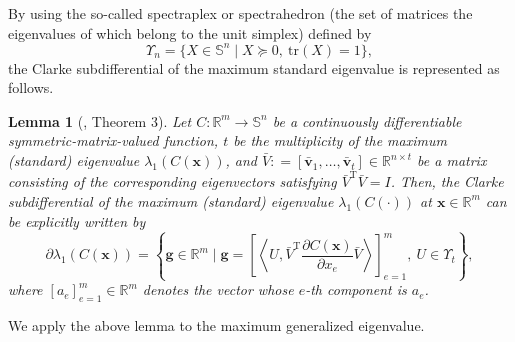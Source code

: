 \documentclass[sn-mathphys,Numbered]{sn-jnl}%
\theoremstyle{thmstyleone}%
\theoremstyle{thmstyletwo}%
\theoremstyle{thmstylethree}%
\newtheorem{lemma}[theorem]{Lemma}
\newcommand{\e}[1]{\begin{equation}#1\end{equation}}
\def\coloneq{\mathrel{\mathop:}=}
\def\rm{\mathbb{R}^m}
\def\tp{\mathrm{T}}
\def\cpartial{\partial}
\begin{document}
By using the so-called spectraplex or spectrahedron (the set of matrices the eigenvalues of which belong to the unit simplex) defined by
\e{
\Upsilon_n = \{X\in\mathbb{S}^n \mid X\succeq 0,\ \mathrm{tr}(X)=1\},
}
the Clarke subdifferential of the maximum standard eigenvalue is represented as follows.

\begin{lemma}[\cite{overton92}, Theorem 3]
\label{l_ce}
Let $C:\rm\to\mathbb{S}^n$ be a continuously differentiable symmetric-matrix-valued function, $t$ be the multiplicity of the maximum (standard) eigenvalue $\lambda_1(C(\bm{x}))$, and $\bar{V}\coloneq[\bar{\bm{v}}_1,\ldots,\bar{\bm{v}}_t]\in \mathbb{R}^{n\times t}$ be a matrix consisting of the corresponding eigenvectors satisfying $\bar{V}^\tp \bar{V}=I$. Then, the Clarke subdifferential of the maximum (standard) eigenvalue $\lambda_1(C(\cdot))$ at $\bm{x}\in\rm$ can be explicitly written by
\e{
\cpartial \lambda_1(C(\bm{x})) = \left\{ \bm{g}\in\rm \mid \bm{g}=\left[\left\langle U,\bar{V}^\tp\frac{\partial C(\bm{x})}{\partial x_e}\bar{V}\right\rangle\right]_{e=1}^m,\ U\in\Upsilon_t\right\},
\label{ce}
}
where $[a_e]_{e=1}^m\in\rm$ denotes the vector whose $e$-th component is $a_e$.
\end{lemma}

We apply the above lemma to the maximum generalized eigenvalue.
\end{document}
